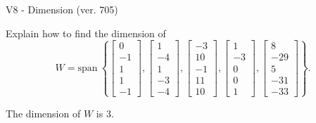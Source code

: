 \begin{exercise}
  \begin{exerciseTitle}V8 - Dimension (ver. 705)\end{exerciseTitle}
  \begin{exerciseStatement}
    Explain how to find the dimension of 
\[W=\mathrm{span}\ \left\{\left[\begin{array}{r}
0 \\
-1 \\
1 \\
1 \\
-1
\end{array}\right] , \left[\begin{array}{r}
1 \\
-4 \\
1 \\
-3 \\
-4
\end{array}\right] , \left[\begin{array}{r}
-3 \\
10 \\
-1 \\
11 \\
10
\end{array}\right] , \left[\begin{array}{r}
1 \\
-3 \\
0 \\
0 \\
1
\end{array}\right] , \left[\begin{array}{r}
8 \\
-29 \\
5 \\
-31 \\
-33
\end{array}\right]\right\}.\]



  \end{exerciseStatement}
  \begin{exerciseAnswer}
   The dimension of \(W\) is  \(3\).
  


  \end{exerciseAnswer}
\end{exercise}